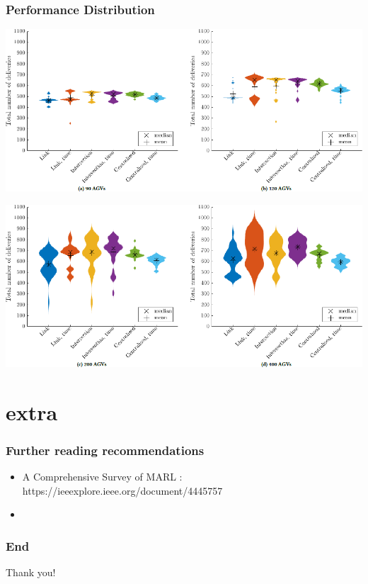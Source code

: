 \documentclass{beamer}
\begin{document}
	\begin{frame}
	\frametitle{Performance Distribution}
	\begin{center}
    \includegraphics[height=0.425\textheight ]{violin1.png}
    
    
     \includegraphics[height=0.425\textheight]{violin2.png}
     \end{center}
	\end{frame}
	
	\section{extra}
	\begin{frame}
	\frametitle{Further reading recommendations}
		\begin{itemize}
			\item A Comprehensive Survey of MARL : https://ieeexplore.ieee.org/document/4445757
			\item 
		\end{itemize}
	\end{frame}
	\begin{frame}
	\frametitle{End}
    Thank you!
	\end{frame}
\end{document}
